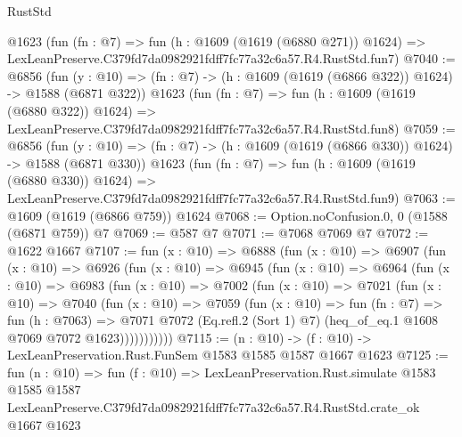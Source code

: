 \begin{lexlean}{RustStd}
\begin{coremodule}
    @1623
    (fun (fn : @7) =>
    fun (h : @1609 (@1619 (@6880 @271)) @1624) =>
    LexLeanPreserve.C379fd7da0982921fdff7fc77a32c6a57.R4.RustStd.fun7)
@7040 := @6856
    (fun (y : @10) => (fn : @7) -> (h : @1609 (@1619 (@6866 @322)) @1624) -> @1588 (@6871 @322))
    @1623
    (fun (fn : @7) =>
    fun (h : @1609 (@1619 (@6880 @322)) @1624) =>
    LexLeanPreserve.C379fd7da0982921fdff7fc77a32c6a57.R4.RustStd.fun8)
@7059 := @6856
    (fun (y : @10) => (fn : @7) -> (h : @1609 (@1619 (@6866 @330)) @1624) -> @1588 (@6871 @330))
    @1623
    (fun (fn : @7) =>
    fun (h : @1609 (@1619 (@6880 @330)) @1624) =>
    LexLeanPreserve.C379fd7da0982921fdff7fc77a32c6a57.R4.RustStd.fun9)
@7063 := @1609 (@1619 (@6866 @759)) @1624
@7068 := Option.noConfusion.{0, 0} (@1588 (@6871 @759)) @7
@7069 := @587 @7
@7071 := @7068 @7069 @7
@7072 := @1622 @1667
@7107 := fun (x : @10) =>
  @6888
    (fun (x : @10) =>
    @6907
      (fun (x : @10) =>
      @6926
        (fun (x : @10) =>
        @6945
          (fun (x : @10) =>
          @6964
            (fun (x : @10) =>
            @6983
              (fun (x : @10) =>
              @7002
                (fun (x : @10) =>
                @7021
                  (fun (x : @10) =>
                  @7040
                    (fun (x : @10) =>
                    @7059
                      (fun (x : @10) =>
                      fun (fn : @7) =>
                      fun (h : @7063) =>
                      @7071
                        @7072
                        (Eq.refl.{2} (Sort 1) @7)
                        (heq_of_eq.{1} @1608 @7069 @7072 @1623)))))))))))
@7115 := (n : @10) -> (f : @10) -> LexLeanPreservation.Rust.FunSem @1583 @1585 @1587 @1667 @1623
@7125 := fun (n : @10) =>
  fun (f : @10) =>
  LexLeanPreservation.Rust.simulate
    @1583
    @1585
    @1587
    LexLeanPreserve.C379fd7da0982921fdff7fc77a32c6a57.R4.RustStd.crate_ok
    @1667
    @1623
\end{coremodule}
\end{lexlean}
